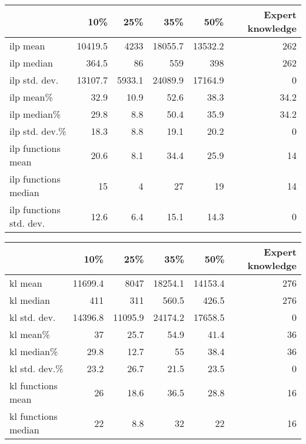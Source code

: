 \begin{tabular}{lrrrrr}
\hline
                         &     10\% &    25\% &     35\% &     50\% &   Expert knowledge \\
\hline
 ilp mean                & 10419.5 & 4233   & 18055.7 & 13532.2 &              262   \\
 ilp median              &   364.5 &   86   &   559   &   398   &              262   \\
 ilp std. dev.           & 13107.7 & 5933.1 & 24089.9 & 17164.9 &                0   \\
 ilp mean\%               &    32.9 &   10.9 &    52.6 &    38.3 &               34.2 \\
 ilp median\%             &    29.8 &    8.8 &    50.4 &    35.9 &               34.2 \\
 ilp std. dev.\%          &    18.3 &    8.8 &    19.1 &    20.2 &                0   \\
 ilp functions mean      &    20.6 &    8.1 &    34.4 &    25.9 &               14   \\
 ilp functions median    &    15   &    4   &    27   &    19   &               14   \\
 ilp functions std. dev. &    12.6 &    6.4 &    15.1 &    14.3 &                0   \\
\hline
\end{tabular}\begin{tabular}{lrrrrr}
\hline
                        &     10\% &     25\% &     35\% &     50\% &   Expert knowledge \\
\hline
 kl mean                & 11699.4 &  8047   & 18254.1 & 14153.4 &                276 \\
 kl median              &   411   &   311   &   560.5 &   426.5 &                276 \\
 kl std. dev.           & 14396.8 & 11095.9 & 24174.2 & 17658.5 &                  0 \\
 kl mean\%               &    37   &    25.7 &    54.9 &    41.4 &                 36 \\
 kl median\%             &    29.8 &    12.7 &    55   &    38.4 &                 36 \\
 kl std. dev.\%          &    23.2 &    26.7 &    21.5 &    23.5 &                  0 \\
 kl functions mean      &    26   &    18.6 &    36.5 &    28.8 &                 16 \\
 kl functions median    &    22   &     8.8 &    32   &    22   &                 16 \\

\end{tabular}

